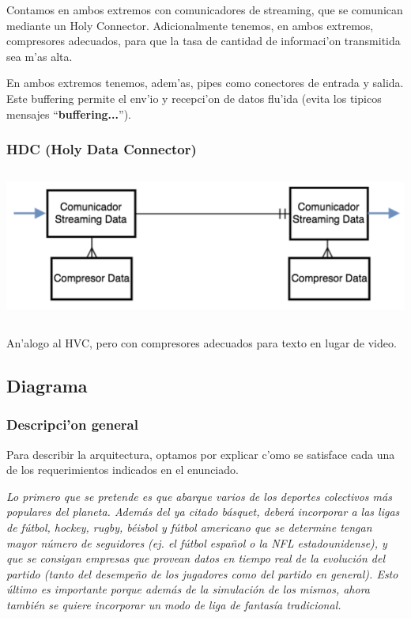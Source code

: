 Contamos en ambos extremos con comunicadores de streaming, que se comunican mediante un Holy Connector. Adicionalmente tenemos, en ambos extremos, compresores adecuados, para que la tasa de cantidad de informaci'on transmitida sea m'as alta.

En ambos extremos tenemos, adem'as, pipes como conectores de entrada y salida. Este buffering permite el env'io y recepci'on de datos flu'ida (evita los tipicos mensajes ``\textbf{buffering...}'').


\subsubsection{HDC (Holy Data Connector)}

\includegraphics[height=5cm]{diagramas/HDC} 

An'alogo al HVC, pero con compresores adecuados para texto en lugar de video. 

\subsection{Diagrama}

\subsubsection{Descripci'on general}

Para describir la arquitectura, optamos por explicar c'omo se satisface cada una de los requerimientos indicados en el enunciado.

\textit{Lo primero que se pretende es que abarque varios de los deportes colectivos más populares del planeta. Además del ya citado básquet, deberá incorporar a las ligas de fútbol, hockey, rugby, béisbol y fútbol americano que se determine tengan mayor número de seguidores (ej. el fútbol español o la NFL estadounidense), y que se consigan empresas que provean datos en tiempo real de la evolución del partido (tanto del desempeño de los jugadores como del partido en general). Esto último es importante porque además de la simulación de los mismos, ahora también se quiere incorporar un modo de liga de fantasía tradicional.}

